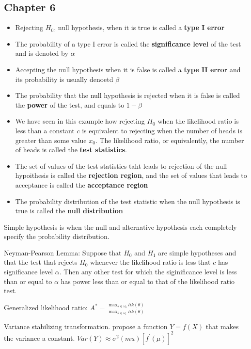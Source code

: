 \documentclass{article}
\begin{document}
\begin{multicols*}{3}
    \section{Chapter 6}
    \begin{itemize}
        \item Rejecting $H_0$, null hypothesis, when it is true is called a \textbf{type I error}
        \item The probability of a type I error is called the \textbf{significance level} of the test and is denoted by $\alpha$
        \item Accepting the null hypothesis when it is false is called a \textbf{type II error} and its probability is usually denoetd $\beta$
        \item The probability that the null hypothesis is rejected when it is false is called the \textbf{power} of the test, and equals to $1-\beta$
        \item We have seen in this example how rejecting $H_0$ when the likelihood ratio is less than a constant $c$ is equivalent to rejecting when the number of heads is greater than some value $x_0$. The likelihood ratio, or equivalently, the number of heads is called the \textbf{test statistics}.
        \item The set of values of the test statistics taht leads to rejection of the null hypoithesis is called the \textbf{rejection region}, and the set of values that leads to acceptance is called the \textbf{acceptance region}
        \item The probability distribution of the test statistic when the null hypothesis is true is called the \textbf{null distribution}
    \end{itemize}

    Simple hypothesis is when the null and alternative hypothesis each completely specify the probability distribution.

    Neyman-Pearson Lemma:
    Suppose that $H_0$ and $H_1$ are simple hypotheses and that the test that rejects $H_0$ whenever the likelihood ratio is less that $c$ has significance level $\alpha$.
    Then any other test for which the siginificance level is less than or equal to $\alpha$ has power less than or equal to that of the likelihood ratio test.

    Generalized likelihood ratio:
    $A^* = \frac{\max_{\theta\in \omega_0} lik\left( \theta \right)}{\max_{\theta\in \omega_1} lik\left( \theta \right)}$

    Variance stabilizing transformation. propose a function $Y=f \left( X \right)$ that makes the variance a constant.
    $Var\left( Y \right) \approx  \sigma^2 \left( mu \right) \left[ f^\prime \left( \mu \right) \right]^2$
\end{multicols*}
\end{document}

